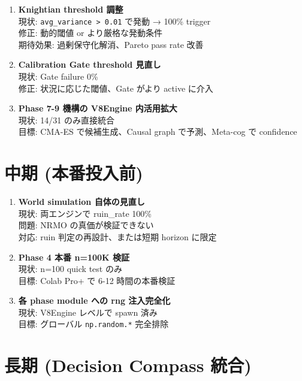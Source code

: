 \documentclass[a4paper,11pt]{report}
\begin{document}
\begin{enumerate}[leftmargin=*]
  \item \textbf{Knightian threshold 調整}\\
    現状: \texttt{avg\_variance > 0.01} で発動 → 100\% trigger\\
    修正: 動的閾値 or より厳格な発動条件\\
    期待効果: 過剰保守化解消、Pareto pass rate 改善
  
  \item \textbf{Calibration Gate threshold 見直し}\\
    現状: Gate failure 0\%\\
    修正: 状況に応じた閾値、Gate がより active に介入
  
  \item \textbf{Phase 7-9 機構の V8Engine 内活用拡大}\\
    現状: 14/31 のみ直接統合\\
    目標: CMA-ES で候補生成、Causal graph で予測、Meta-cog で confidence
\end{enumerate}

\section{中期 (本番投入前)}

\begin{enumerate}[leftmargin=*, start=4]
  \item \textbf{World simulation 自体の見直し}\\
    現状: 両エンジンで ruin\_rate 100\%\\
    問題: NRMO の真価が検証できない\\
    対応: ruin 判定の再設計、または短期 horizon に限定
  
  \item \textbf{Phase 4 本番 n=100K 検証}\\
    現状: n=100 quick test のみ\\
    目標: Colab Pro+ で 6-12 時間の本番検証
  
  \item \textbf{各 phase module への rng 注入完全化}\\
    現状: V8Engine レベルで spawn 済み\\
    目標: グローバル \texttt{np.random.*} 完全排除
\end{enumerate}

\section{長期 (Decision Compass 統合)}
\end{document}

